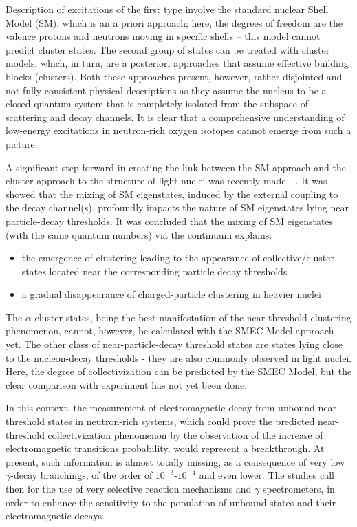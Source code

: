 \bigbreak

Description of excitations of the first type involve the standard nuclear
Shell Model (SM), which is an a priori approach; here, the degrees of freedom
are the valence protons and neutrons moving in specific shells – this model
cannot predict cluster states.
The second group of states can be treated with cluster models, which, in turn,
are a posteriori approaches that assume effective building blocks (clusters).
Both these approaches present, however, rather disjointed and not fully
consistent physical descriptions as they assume the nucleus to be a closed
quantum system that is completely isolated from the subspace of scattering and
decay channels. It is clear that a comprehensive understanding of low-energy
excitations in neutron-rich oxygen isotopes cannot emerge from such a picture.

\bigbreak

A significant step forward in creating the link between the SM approach and
the cluster approach to the structure of light nuclei was recently
made~\cite{oko:cluster}~\cite{oko:origin}.
It was showed that the mixing of SM eigenstates, induced by the external
coupling to the decay channel(s), profoundly impacts the nature of SM
eigenstates lying near particle-decay thresholds. 
It was concluded that the mixing of SM eigenstates (with the same quantum
numbers) via the continuum explains:

\begin{itemize}
\item the emergence of clustering leading to the appearance of
collective/cluster states located near the corresponding particle decay
thresholds
\item a gradual disappearance of charged-particle clustering in heavier nuclei
\end{itemize}

The $\alpha$-cluster states, being the best manifestation of the near-threshold
clustering phenomenon, cannot, however, be calculated with the SMEC Model
approach yet. The other class of near-particle-decay threshold states are
states lying close to the nucleon-decay thresholds - they are also
commonly observed in light nuclei. Here, the degree of collectivization can be
predicted by the SMEC Model, but the clear comparison with experiment has not
yet been done. 

\bigbreak

In this context, the measurement of electromagnetic decay from unbound
near-threshold states in neutron-rich systems, which could prove the predicted
near-threshold collectivization phenomenon by the observation of the increase
of electromagnetic transitions probability, would represent a breakthrough.
At present, such information is almost totally missing, as a consequence of
very low  $\gamma$-decay branchings, of the order of $10^{-3}$-$10^{-4}$ and
even lower. The studies call then for the use of very selective reaction
mechanisms and $\gamma$ spectrometers, in order to enhance the sensitivity to
the population of unbound states and their electromagnetic decays.



